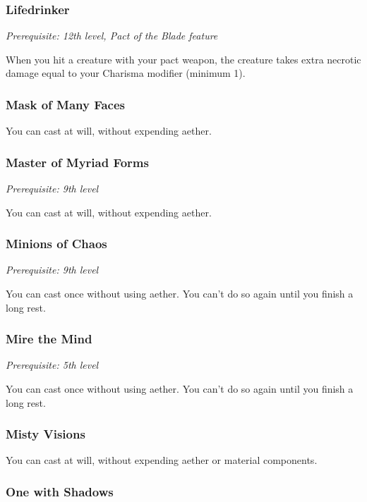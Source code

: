 \subsubsection{Lifedrinker}

\textit{Prerequisite: 12th level, Pact of the Blade feature}

When you hit a creature with your pact weapon, the creature takes extra necrotic damage equal to your Charisma modifier (minimum 1).

\subsubsection{Mask of Many Faces}

You can cast  at will, without expending aether.

\subsubsection{Master of Myriad Forms}

\textit{Prerequisite: 9th level}

You can cast  at will, without expending aether.

\subsubsection{Minions of Chaos}

\textit{Prerequisite: 9th level}

You can cast  once without using aether. You can't do so again until you finish a long rest.

\subsubsection{Mire the Mind}

\textit{Prerequisite: 5th level}

You can cast  once without using aether. You can't do so again until you finish a long rest.

\subsubsection{Misty Visions}

You can cast  at will, without expending aether or material components.

\subsubsection{One with Shadows}

